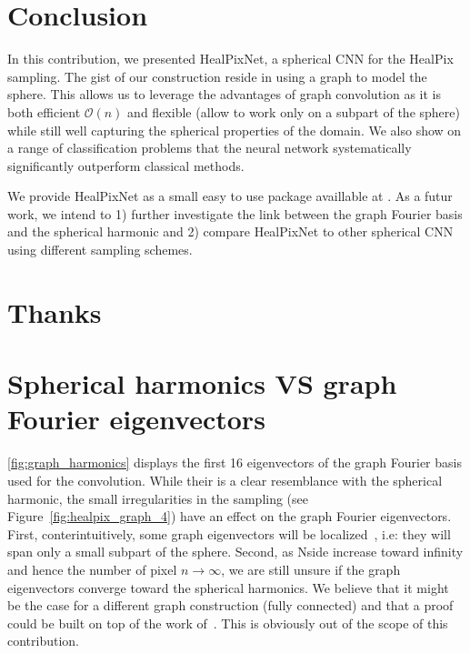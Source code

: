\documentclass[final,twocolumn,3p,times,authoryear]{elsarticle}
\newcommand{\todo}[1]{{\color[rgb]{.6,.1,.6}{#1}}}
\newcommand{\figref}[1]{Figure~\ref{fig:#1}}
\newcommand{\1}{\b{1}}              %
\newcommand{\0}{\b{0}}              %
\begin{document}
\section{Conclusion}
\label{sec:conclusion}

In this contribution, we presented HealPixNet, a spherical CNN for the HealPix sampling. The gist of our construction reside in using a graph to model the sphere. 
This allows us to leverage the advantages of graph convolution as it is both efficient $\mathcal{O}(n)$ and flexible (allow to work only on a subpart of the sphere) while still well capturing the spherical properties of the domain. 
We also show on a range of classification problems that the neural network systematically significantly outperform classical methods. 

We provide HealPixNet as a small easy to use package availlable at \todo{\url{https://github.com/xxx}}. 
As a futur work, we intend to 1) further investigate the link between the graph Fourier basis and the spherical harmonic and 2) compare HealPixNet to other spherical CNN using different sampling schemes.

\section*{Thanks}

\appendix

\section{Spherical harmonics VS graph Fourier eigenvectors}
\ref{fig:graph_harmonics} displays the first 16 eigenvectors of the
graph Fourier basis used for the convolution. While their is a clear
resemblance with the spherical harmonic, the small irregularities in the
sampling (see \figref{healpix_graph_4}) have an effect on the
graph Fourier eigenvectors. First, conterintuitively, some graph eigenvectors will be
localized~\cite{perraudin2018global}, i.e: they will span only a small subpart
of the sphere.  Second, as Nside increase toward infinity and hence the number
of pixel $n\rightarrow \infty$, we are still unsure if the graph eigenvectors
converge toward the spherical harmonics. We believe that it might be the case
for a different graph construction (fully connected) and that a proof could be
built on top of the work of~\cite{belkin2007convergence}. This is obviously
out of the scope of this contribution.
\end{document}
